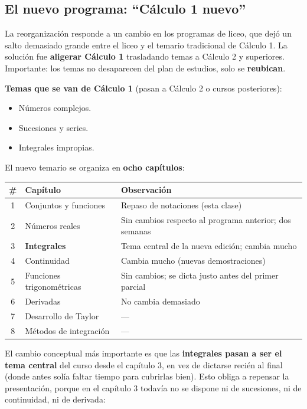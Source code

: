 \documentclass[12pt,a4paper]{article}
\begin{document}
\subsection{El nuevo programa: ``Cálculo 1 nuevo''}

La reorganización responde a un cambio en los programas de liceo, que dejó
un salto demasiado grande entre el liceo y el temario tradicional de
Cálculo 1. La solución fue \textbf{aligerar Cálculo 1} trasladando temas a
Cálculo 2 y superiores. Importante: los temas no desaparecen del plan de
estudios, solo se \textbf{reubican}.

\textbf{Temas que se van de Cálculo 1} (pasan a Cálculo 2 o cursos
posteriores):

\begin{itemize}
  \item Números complejos.
  \item Sucesiones y series.
  \item Integrales impropias.
\end{itemize}

El nuevo temario se organiza en \textbf{ocho capítulos}:

\begin{table}[H]
\centering
\begin{tabular}{@{}clp{7cm}@{}}
\toprule
\# & Capítulo & Observación \\
\midrule
1 & Conjuntos y funciones & Repaso de notaciones (esta clase) \\
2 & Números reales & Sin cambios respecto al programa anterior; dos semanas \\
3 & \textbf{Integrales} & Tema central de la nueva edición; cambia mucho \\
4 & Continuidad & Cambia mucho (nuevas demostraciones) \\
5 & Funciones trigonométricas & Sin cambios; se dicta justo antes del primer parcial \\
6 & Derivadas & No cambia demasiado \\
7 & Desarrollo de Taylor & --- \\
8 & Métodos de integración & --- \\
\bottomrule
\end{tabular}
\end{table}

El cambio conceptual más importante es que las \textbf{integrales pasan a
ser el tema central} del curso desde el capítulo 3, en vez de dictarse
recién al final (donde antes solía faltar tiempo para cubrirlas bien). Esto
obliga a repensar la presentación, porque en el capítulo 3 todavía no se
dispone ni de sucesiones, ni de continuidad, ni de derivada:
\end{document}
